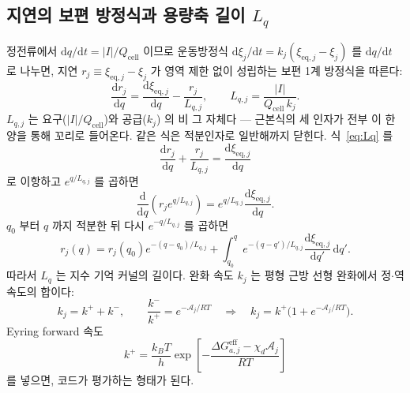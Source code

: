 \documentclass[11pt,a4paper]{article}
\newcommand{\dd}{\mathrm{d}}
\newcommand{\eff}{\mathrm{eff}}
\newcommand{\eq}{\mathrm{eq}}
\newcommand{\cell}{\mathrm{cell}}
\begin{document}
\subsection{지연의 보편 방정식과 용량축 길이 $L_q$}
정전류에서 $\dd q/\dd t=|I|/Q_\cell$ 이므로 운동방정식 $\dd\xi_j/\dd t=k_j(\xi_{\eq,j}-\xi_j)$ 를 $\dd q/\dd t$ 로
나누면, 지연 $r_j\equiv\xi_{\eq,j}-\xi_j$ 가 영역 제한 없이 성립하는 보편 1계 방정식을 따른다:
\begin{equation}
\frac{\dd r_j}{\dd q}=\frac{\dd\xi_{\eq,j}}{\dd q}-\frac{r_j}{L_{q,j}},
\qquad L_{q,j}=\frac{|I|}{Q_\cell\,k_j}.
\label{eq:Lq}
\end{equation}
$L_{q,j}$ 는 요구($|I|/Q_\cell$)와 공급($k_j$) 의 비 그 자체다 — 근본식의 세 인자가 전부 이 한 양을 통해 꼬리로
들어온다. 같은 식은 적분인자로 일반해까지 닫힌다. 식~\eqref{eq:Lq} 를
\begin{equation}
\frac{\dd r_j}{\dd q}+\frac{r_j}{L_{q,j}}=\frac{\dd\xi_{\eq,j}}{\dd q}
\label{eq:Lq_linear}
\end{equation}
로 이항하고 $e^{q/L_{q,j}}$ 를 곱하면
\begin{equation}
\frac{\dd}{\dd q}\!\left(r_j e^{q/L_{q,j}}\right)
=e^{q/L_{q,j}}\frac{\dd\xi_{\eq,j}}{\dd q}.
\label{eq:Lq_ifactor}
\end{equation}
$q_0$ 부터 $q$ 까지 적분한 뒤 다시 $e^{-q/L_{q,j}}$ 를 곱하면
\begin{equation}
r_j(q)=r_j(q_0)e^{-(q-q_0)/L_{q,j}}
+\int_{q_0}^{q}e^{-(q-q')/L_{q,j}}
\frac{\dd\xi_{\eq,j}}{\dd q'}\,\dd q'.
\label{eq:Lq_memory}
\end{equation}
따라서 $L_q$ 는 지수 기억 커널의 길이다. 완화 속도 $k_j$ 는 평형 근방 선형 완화에서 정$\cdot$역 속도의 합이다:
\begin{equation}
k_j=k^++k^-,
\qquad
\frac{k^-}{k^+}=e^{-\mathcal A_j/RT}
\quad\Longrightarrow\quad
k_j=k^+\big(1+e^{-\mathcal A_j/RT}\big).
\label{eq:k_sum_v809}
\end{equation}
Eyring forward 속도 \cite{eyring1935}
\begin{equation}
k^+=\frac{k_BT}{h}
\exp\!\left[-\frac{\Delta G_{a,j}^\eff-\chi_d\mathcal A_j}{RT}\right]
\label{eq:kplus_v809}
\end{equation}
를 넣으면, 코드가 평가하는 형태가 된다.
\end{document}
